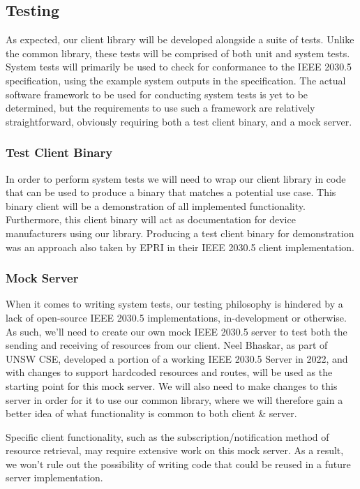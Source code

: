 \subsection{Testing}
As expected, our client library will be developed alongside a suite of tests. Unlike the common library, these tests will be comprised of both unit and system tests.
System tests will primarily be used to check for conformance to the IEEE 2030.5 specification, using the example system outputs in the specification.
The actual software framework to be used for conducting system tests is yet to be determined, but the requirements to use such a framework are relatively straightforward, obviously requiring both a test client binary, and a mock server.


\subsubsection{Test Client Binary}
In order to perform system tests we will need to wrap our client library in code that can be used to produce a binary that matches a potential use case.
This binary client will be a demonstration of all implemented functionality.
Furthermore, this client binary will act as documentation for device manufacturers using our library.
Producing a test client binary for demonstration was an approach also taken by EPRI in their IEEE 2030.5 client implementation.

\subsubsection{Mock Server}

When it comes to writing system tests, our testing philosophy is hindered by a lack of open-source IEEE 2030.5 implementations, in-development or otherwise.
As such, we'll need to create our own mock IEEE 2030.5 server to test both the sending and receiving of resources from our client.
Neel Bhaskar, as part of UNSW CSE, developed a portion of a working IEEE 2030.5 Server in 2022, and with changes to support hardcoded resources and routes, will be used as the starting point for this mock server.
We will also need to make changes to this server in order for it to use our common library, where we will therefore gain a better idea of what functionality is common to both client \& server.

Specific client functionality, such as the subscription/notification method of resource retrieval, may require extensive work on this mock server. 
As a result, we won't rule out the possibility of writing code that could be reused in a future server implementation.










